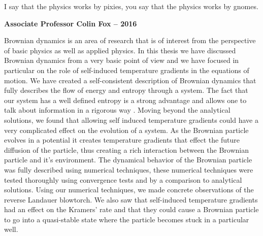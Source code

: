 \epigraph{I say that the physics works by pixies, you say that the physics works by gnomes.}{\textbf{Associate Professor Colin Fox -- 2016}}
Brownian dynamics is an area of research that is of interest from the perspective of basic physics as well as applied physics. In this thesis we have discussed Brownian dynamics from a very basic point of view and we have focused in particular on the role of self-induced temperature gradients in the equations of motion. We have created a self-consistent description of Brownian dynamics that fully describes the flow of energy and entropy through a system. The fact that our system has a well defined entropy is a strong advantage and allows one to talk about information in a rigorous way \cite{Landauer1961,MyersCelebranoKrishnan2015}. Moving beyond the analytical solutions, we found that allowing self induced temperature gradients could have a very complicated effect on the evolution of a system. As the Brownian particle evolves in a potential it creates temperature gradients that effect the future diffusion of the particle, thus creating a rich interaction between the Brownian particle and it's environment. The dynamical behavior of the Brownian particle was fully described using numerical techniques, these numerical techniques were tested thoroughly using convergence tests and by a comparison to analytical solutions. Using our numerical techniques, we made concrete observations of the reverse Landauer blowtorch. We also saw that self-induced temperature gradients had an effect on the Kramers' rate and that they could cause a Brownian particle to go into a quasi-stable state where the particle becomes stuck in a particular well.


